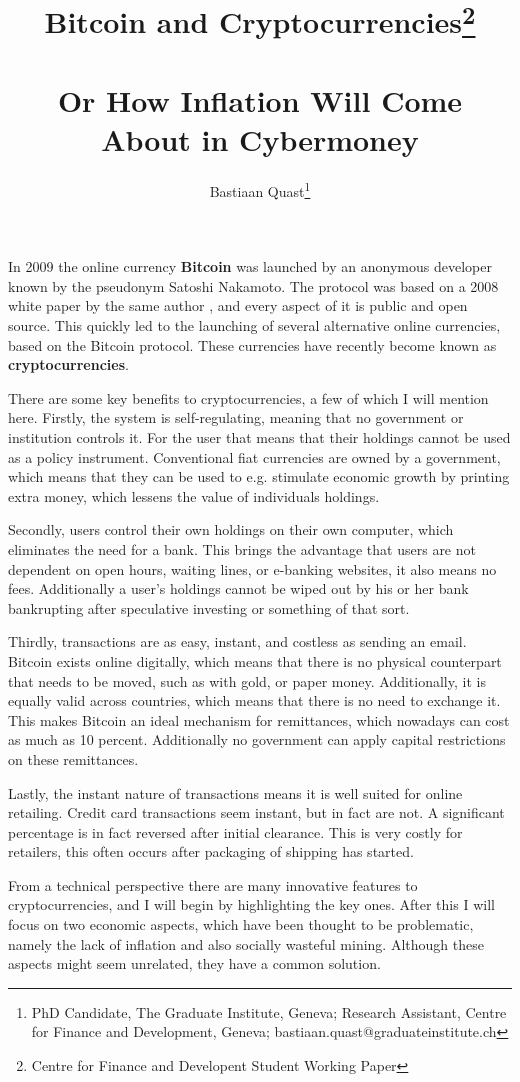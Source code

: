\documentclass[12pt]{article}\usepackage[]{graphicx}\usepackage[]{color}
\title{ Bitcoin and Cryptocurrencies\footnote{Centre for Finance and Developent Student Working Paper}\\
        ~\\
        Or How Inflation Will Come About in Cybermoney
      }
\author{Bastiaan Quast\footnote{PhD Candidate, The Graduate Institute, Geneva; Research Assistant, Centre for Finance and Development, Geneva; bastiaan.quast@graduateinstitute.ch}}
\begin{document}
\maketitle
In 2009 the online currency \textbf{Bitcoin} was launched by an anonymous developer known by the pseudonym Satoshi Nakamoto.
The protocol was based on a 2008 white paper by the same author \parencite{nakamoto2008bitcoin}, and every aspect of it is public and open source.
This quickly led to the launching of several alternative online currencies, based on the Bitcoin protocol.
These currencies have recently become known as \textbf{cryptocurrencies}.

There are some key benefits to cryptocurrencies, a few of which I will mention here.
Firstly, the system is self-regulating, meaning that no government or institution controls it.
For the user that means that their holdings cannot be used as a policy instrument.
Conventional fiat currencies are owned by a government,
which means that they can be used to e.g. stimulate economic growth by printing extra money,
which lessens the value of individuals holdings.

Secondly, users control their own holdings on their own computer, which eliminates the need for a bank.
This brings the advantage that users are not dependent on open hours,
waiting lines, or e-banking websites, it also means no fees.
Additionally a user's holdings cannot be wiped out by his or her bank bankrupting after speculative investing or something of that sort.

Thirdly, transactions are as easy, instant, and costless as sending an email.
Bitcoin exists online digitally,
which means that there is no physical counterpart that needs to be moved,
such as with gold, or paper money.
Additionally, it is equally valid across countries, which means that there is no need to exchange it.
This makes Bitcoin an ideal mechanism for remittances, which nowadays can cost as much as 10 percent.
Additionally no government can apply capital restrictions on these remittances.

Lastly, the instant nature of transactions means it is well suited for online retailing.
Credit card transactions seem instant, but in fact are not.
A significant percentage is in fact reversed after initial clearance.
This is very costly for retailers, this often occurs after packaging of shipping has started.

From a technical perspective there are many innovative features to cryptocurrencies,
and I will begin by highlighting the key ones.
After this I will focus on two economic aspects, which have been thought to be problematic,
namely the lack of inflation and also socially wasteful mining.
Although these aspects might seem unrelated, they have a common solution.
\end{document}
